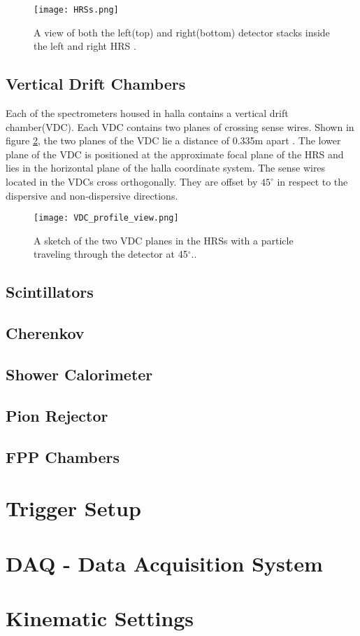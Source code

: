 \begin{figure}
\centering

\texttt{[image: HRSs.png]}

\caption{A view of both the left(top) and right(bottom) detector stacks inside the left and right HRS \cite{HallA}.
\label{hrsss}}
\end{figure}


	\subsection{Vertical Drift Chambers}
	Each of the spectrometers housed in halla contains a vertical drift chamber(VDC). Each VDC contains two planes of crossing sense wires. Shown in figure \ref{VDC_profile}, the two planes of the VDC lie a distance of 0.335m apart \cite{drift}. The lower plane of the VDC is positioned at the approximate focal plane of the HRS and lies in the horizontal plane of the halla coordinate system. The sense wires located in the VDCs cross orthogonally. They are offset by $45^\circ$ in respect to the dispersive and non-dispersive directions. 
	
	\cite{drift}
	
	
	\begin{figure}
	\centering
	
	\texttt{[image: VDC\_profile\_view.png]}
	
	\caption{A sketch of the two VDC planes in the HRSs with a particle traveling through the detector at 45$^\circ$.\cite{drift}.
	\label{VDC_profile}}
	\end{figure}
	
	
	
	
	
	\subsection{Scintillators}	\subsection{Cherenkov}
	\subsection{Shower Calorimeter}
	\subsection{Pion Rejector}
	\subsection{FPP Chambers}

\section{Trigger Setup}
\section{DAQ - Data Acquisition System}

\section{Kinematic Settings}









